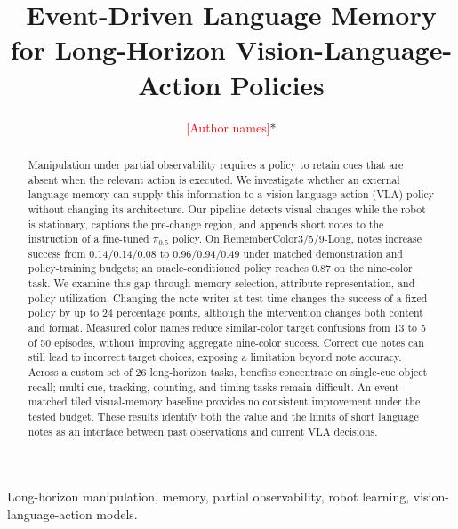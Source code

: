 \documentclass{IJCAS}
\newcommand{\tbd}[1]{\textcolor{red}{[#1]}}
\begin{document}
\title{Event-Driven Language Memory for Long-Horizon Vision-Language-Action Policies}

\author{\tbd{Author names}*}

\begin{abstract}
Manipulation under partial observability requires a policy to retain cues that are absent when the relevant action is executed.
We investigate whether an external language memory can supply this information to a vision-language-action (VLA) policy without changing its architecture.
Our pipeline detects visual changes while the robot is stationary, captions the pre-change region, and appends short notes to the instruction of a fine-tuned $\pi_{0.5}$ policy.
On RememberColor3/5/9-Long, notes increase success from 0.14/0.14/0.08 to 0.96/0.94/0.49 under matched demonstration and policy-training budgets; an oracle-conditioned policy reaches 0.87 on the nine-color task.
We examine this gap through memory selection, attribute representation, and policy utilization.
Changing the note writer at test time changes the success of a fixed policy by up to 24 percentage points, although the intervention changes both content and format.
Measured color names reduce similar-color target confusions from 13 to 5 of 50 episodes, without improving aggregate nine-color success.
Correct cue notes can still lead to incorrect target choices, exposing a limitation beyond note accuracy.
Across a custom set of 26 long-horizon tasks, benefits concentrate on single-cue object recall; multi-cue, tracking, counting, and timing tasks remain difficult.
An event-matched tiled visual-memory baseline provides no consistent improvement under the tested budget.
These results identify both the value and the limits of short language notes as an interface between past observations and current VLA decisions.
\end{abstract}

\begin{keywords}
Long-horizon manipulation, memory, partial observability, robot learning, vision-language-action models.
\end{keywords}

\maketitle

\makeAuthorInformation{
\tbd{Manuscript received ...; affiliations; e-mails.}\\

* Corresponding author.
}
\end{document}
